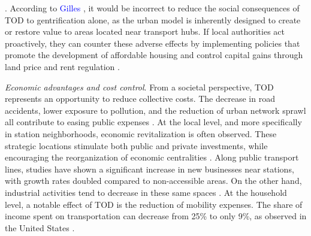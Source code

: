\begin{refsegment}
{}. According to \textcolor{blue}{Gilles} \textcolor{blue}{\textcite[32]{bentayou_transit-oriented_2015}}, it would be incorrect to reduce the social consequences of \acrshort{TOD} to gentrification alone, as the urban model is inherently designed to create or restore value to areas located near transport hubs. If local authorities act proactively, they can counter these adverse effects by implementing policies that promote the development of affordable housing and control capital gains through land price and rent regulation \textcolor{blue}{\autocites[17]{litman_evaluating_2011}[32]{bentayou_transit-oriented_2015}{yu_valueadded_2018}[463]{harrison_corridors_2019}{ewing_is_2022}}.%

\textsl{Economic advantages and cost control}. From a societal perspective, \acrshort{TOD} represents an opportunity to reduce collective costs. The decrease in road accidents, lower exposure to pollution, and the reduction of urban network sprawl all contribute to easing public expenses \textcolor{blue}{\autocite[17]{litman_evaluating_2011}}. At the local level, and more specifically in station neighborhoods, economic revitalization is often observed. These strategic locations stimulate both public and private investments, while encouraging the reorganization of economic centralities \textcolor{blue}{\autocites[89]{knowles_investigation_2014}[6]{knowles_evaluation_2016}}. Along public transport lines, studies have shown a significant increase in new businesses near stations, with growth rates doubled compared to non-accessible areas. On the other hand, industrial activities tend to decrease in these same spaces \textcolor{blue}{\autocites{duncan_impact_2011}{credit_transit-oriented_2018}}. At the household level, a notable effect of \acrshort{TOD} is the reduction of mobility expenses. The share of income spent on transportation can decrease from 25\% to only 9\%, as observed in the United States \textcolor{blue}{\autocites[25]{beauvais_amenagements_2017}[25]{nahlik_transit-oriented_2014}[38]{ohland_communicating_2006}}.%


\end{refsegment}
